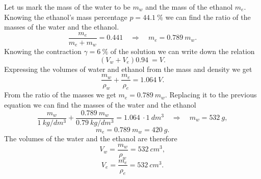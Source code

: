 {\ifEngSolution
Let us mark the mass of the water to be $m_w$ and the mass of the ethanol $m_e$. Knowing the ethanol’s mass percentage $p = \SI{44,1}{\percent}$ we can find the ratio of the masses of the water and the ethanol. 
\[ \frac{m_e}{m_e+m_w}=\SI{0,441}  \quad\Rightarrow\quad m_e=\SI{0,789}{}m_w.\]
Knowing the contraction $\gamma = \SI{6}{\percent}$ of the solution we can write down the relation
\[ (V_w + V_e)\SI{0,94}{} = V.\]
Expressing the volumes of water and ethanol from the mass and density we get
\[ \frac{m_w}{\rho_w} + \frac{m_e}{\rho_e} = \SI{1,064}{}V.\]
From the ratio of the masses we get $m_e=\SI{0,789}{}m_w$. Replacing it to the previous equation we can find the masses of the water and the ethanol
\[ \frac{m_w}{\SI{1}{kg/dm^3}} + \frac{\SI{0,789}{}{m_w}}{\SI{0,79}{kg/dm^3}} = \SI{1,064}{}\cdot\SI{1}{dm^3} \quad\Rightarrow\quad
m_w = \SI{532}{g},\]
\[ m_e = \SI{0,789}{}m_w =  \SI{420}{g}.\]
The volumes of the water and the ethanol are therefore
\[ V_w = \frac{m_w}{\rho_w} = \SI{532}{cm^3},\]
\[ V_e = \frac{m_e}{\rho_e} =  \SI{532}{cm^3}.\]
\fi
}